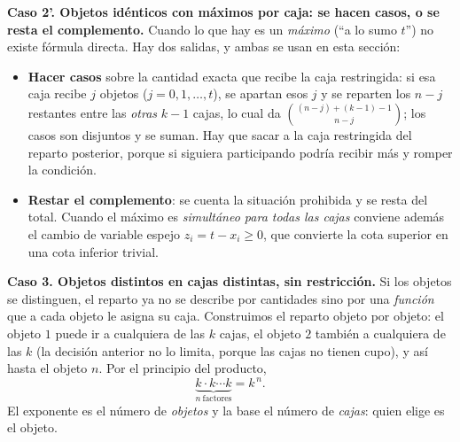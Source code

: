 \documentclass[11pt]{article}
\begin{document}
\begin{teo}
\medskip
\textbf{Caso 2'. Objetos idénticos con máximos por caja: se hacen casos, o se resta el complemento.}
Cuando lo que hay es un \emph{máximo} (``a lo sumo $t$'') no existe fórmula directa. Hay dos salidas, y ambas se usan en esta sección:
\begin{itemize}[leftmargin=1.2cm]
  \item \textbf{Hacer casos} sobre la cantidad exacta que recibe la caja restringida: si esa caja recibe $j$ objetos ($j=0,1,\dots,t$), se apartan esos $j$ y se reparten los $n-j$ restantes entre las \emph{otras} $k-1$ cajas, lo cual da $\binom{(n-j)+(k-1)-1}{n-j}$; los casos son disjuntos y se suman. Hay que sacar a la caja restringida del reparto posterior, porque si siguiera participando podría recibir más y romper la condición.
  \item \textbf{Restar el complemento}: se cuenta la situación prohibida y se resta del total. Cuando el máximo es \emph{simultáneo para todas las cajas} conviene además el cambio de variable espejo $z_i=t-x_i\ge0$, que convierte la cota superior en una cota inferior trivial.
\end{itemize}

\medskip
\textbf{Caso 3. Objetos distintos en cajas distintas, sin restricción.}
Si los objetos se distinguen, el reparto ya no se describe por cantidades sino por una \emph{función} que a cada objeto le asigna su caja. Construimos el reparto objeto por objeto: el objeto $1$ puede ir a cualquiera de las $k$ cajas, el objeto $2$ también a cualquiera de las $k$ (la decisión anterior no lo limita, porque las cajas no tienen cupo), y así hasta el objeto $n$. Por el principio del producto,
\[
\underbrace{k\cdot k\cdots k}_{n\ \text{factores}}=k^{\,n}.
\]
El exponente es el número de \emph{objetos} y la base el número de \emph{cajas}: quien elige es el objeto.


\end{teo}
\end{document}
